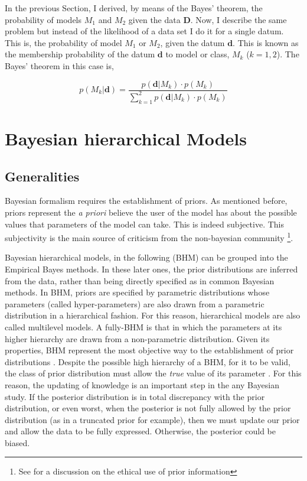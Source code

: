 In the previous Section, I derived, by means of the Bayes' theorem, the probability of models $M_1$ and $M_2$ given the data $\mathbf{D}$. Now, I describe the same problem but instead of the likelihood of a data set I do it for a single datum. This is, the probability of model $M_1$ or $M_2$, given the datum $\mathbf{d}$. This is known as the membership probability of the datum $\mathbf{d}$ to model or class, $M_k$ ($k=1,2$). The Bayes' theorem in this case is,

\begin{equation}
\label{eq:prob}
p( M_k | \mathbf{d}) =\frac{p(\mathbf{d}|M_k)\cdot p(M_k)}{\sum_{k=1}^2 p(\mathbf{d}|M_k)\cdot p(M_k)} 
\end{equation}

\section{Bayesian hierarchical Models}
\subsection{Generalities}
Bayesian formalism requires the establishment of priors. As mentioned before, priors represent the \emph{a priori} believe the user of the model has about the possible values that parameters of the model can take. This is indeed subjective. This subjectivity is the main source of criticism from the non-bayesian community \footnote{See \citet{Gelman2012} for a discussion on the ethical use of prior information}. 

Bayesian hierarchical models, in the following (BHM) can be grouped into the Empirical Bayes methods. In these later ones, the prior distributions are inferred from the data, rather than being directly specified as in common Bayesian methods. In BHM, priors are specified by parametric distributions whose parameters (called hyper-parameters) are also drawn from a parametric distribution in a hierarchical fashion. For this reason, hierarchical models are also called multilevel models. A fully-BHM is that in which the parameters at its higher hierarchy are drawn from a non-parametric distribution. Given its properties, BHM represent the most objective way to the establishment of prior distributions \citep{Gelman2006}. Despite the possible high hierarchy of a BHM, for it to be valid, the class of prior distribution must allow the \emph{true} value of its parameter \citep{Morris1983}. For this reason, the updating of knowledge is an important step in the any Bayesian study. If the posterior distribution is in total discrepancy with the prior distribution, or even worst, when the posterior is not fully allowed by the prior distribution (as in a truncated prior for example), then we must update our prior and allow the data to be fully expressed. Otherwise, the posterior could be biased.


